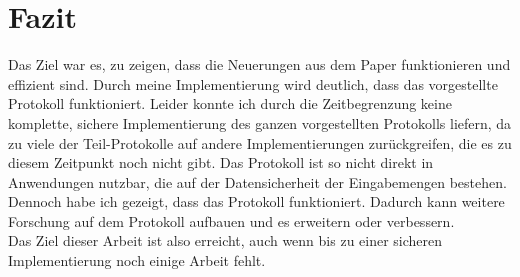 \chapter{Fazit}

Das Ziel war es, zu zeigen, dass die Neuerungen aus dem Paper \cite{Doettling2021} funktionieren und effizient sind. Durch meine Implementierung wird deutlich, dass das vorgestellte Protokoll funktioniert. 
Leider konnte ich durch die Zeitbegrenzung keine komplette, sichere Implementierung des ganzen vorgestellten Protokolls liefern, da zu viele der Teil-Protokolle auf andere Implementierungen zurückgreifen, die es zu diesem Zeitpunkt noch nicht gibt.
Das Protokoll ist so nicht direkt in Anwendungen nutzbar, die auf der Datensicherheit der Eingabemengen bestehen.
Dennoch habe ich gezeigt, dass das Protokoll funktioniert. Dadurch kann weitere Forschung auf dem Protokoll aufbauen und es erweitern oder verbessern.\\
Das Ziel dieser Arbeit ist also erreicht, auch wenn bis zu einer sicheren Implementierung noch einige Arbeit fehlt.
